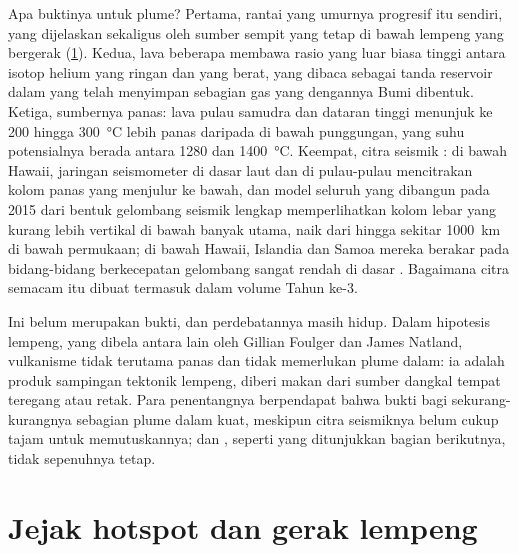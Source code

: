 Apa buktinya untuk plume? Pertama, rantai yang umurnya progresif itu sendiri, yang dijelaskan sekaligus oleh sumber sempit yang tetap di bawah lempeng yang bergerak (\cref{sec:b1:hotspots:tracks}). Kedua, lava beberapa  membawa rasio yang luar biasa tinggi antara isotop helium yang ringan dan yang berat, yang dibaca sebagai tanda reservoir dalam yang telah menyimpan sebagian gas yang dengannya Bumi dibentuk. Ketiga, sumbernya panas: lava pulau samudra dan dataran tinggi menunjuk ke  200 hingga \qty{300}{\celsius} lebih panas daripada  di bawah punggungan, yang suhu potensialnya berada antara 1280 dan \qty{1400}{\celsius}. Keempat, citra seismik : di bawah Hawaii, jaringan seismometer di dasar laut dan di pulau-pulau mencitrakan kolom panas yang menjulur ke  bawah, dan model seluruh  yang dibangun pada 2015 dari bentuk gelombang seismik lengkap memperlihatkan kolom lebar yang kurang lebih vertikal di bawah banyak  utama, naik dari  hingga sekitar \qty{1000}{km} di bawah permukaan; di bawah Hawaii, Islandia dan Samoa mereka berakar pada bidang-bidang berkecepatan gelombang sangat rendah di dasar . Bagaimana citra semacam itu dibuat termasuk dalam volume Tahun ke-3.

Ini belum merupakan bukti, dan perdebatannya masih hidup. Dalam hipotesis lempeng, yang dibela antara lain oleh Gillian Foulger dan James Natland, vulkanisme  tidak terutama panas dan tidak memerlukan plume dalam: ia adalah produk sampingan tektonik lempeng, diberi makan dari sumber dangkal tempat  teregang atau retak. Para penentangnya berpendapat bahwa bukti bagi sekurang-kurangnya sebagian plume dalam kuat, meskipun citra seismiknya belum cukup tajam untuk memutuskannya; dan , seperti yang ditunjukkan bagian berikutnya, tidak sepenuhnya tetap.

\section{Jejak hotspot dan gerak lempeng}\label{sec:b1:hotspots:tracks}

